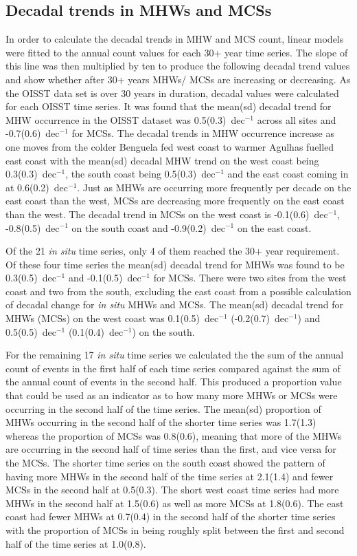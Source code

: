 \documentclass[a4paper,10pt,review]{elsarticle}
\begin{document}
\subsection{Decadal trends in MHWs and MCSs}
In order to calculate the decadal trends in MHW and MCS count, linear models were fitted to the annual count values for each 30+ year time series. The slope of this line was then multiplied by ten to produce the following decadal trend values and show whether after 30+ years MHWs/ MCSs are increasing or decreasing. As the OISST data set is over 30 years in duration, decadal values were calculated for each OISST time series. It was found that the mean(sd) decadal trend for MHW occurrence in the OISST dataset was 0.5(0.3)~dec$^{-1}$ across all sites and -0.7(0.6)~dec$^{-1}$ for MCSs. The decadal trends in MHW occurrence increase as one moves from the colder Benguela fed west coast to warmer Agulhas fuelled east coast with the mean(sd) decadal MHW trend on the west coast being 0.3(0.3)~dec$^{-1}$, the south coast being 0.5(0.3)~dec$^{-1}$ and the east coast coming in at 0.6(0.2)~dec$^{-1}$. Just as MHWs are occurring more frequently per decade on the east coast than the west, MCSs are decreasing more frequently on the east coast than the west. The decadal trend in MCSs on the west coast is -0.1(0.6)~dec$^{-1}$, -0.8(0.5)~dec$^{-1}$ on the south coast and -0.9(0.2)~dec$^{-1}$ on the east coast.

Of the 21 \emph{in situ} time series, only 4 of them reached the 30+ year requirement. Of these four time series the mean(sd) decadal trend for MHWs was found to be 0.3(0.5)~dec$^{-1}$ and -0.1(0.5)~dec$^{-1}$ for MCSs. There were two sites from the west coast and two from the south, excluding the east coast from a possible calculation of decadal change for \emph{in situ} MHWs and MCSs. The mean(sd) decadal trend for MHWs (MCSs) on the west coast was 0.1(0.5)~dec$^{-1}$ (-0.2(0.7)~dec$^{-1}$) and 0.5(0.5)~dec$^{-1}$ (0.1(0.4)~dec$^{-1}$) on the south.

For the remaining 17 \emph{in situ} time series we calculated the the sum of the annual count of events in the first half of each time series compared against the sum of the annual count of events in the second half. This produced a proportion value that could be used as an indicator as to how many more MHWs or MCSs were occurring in the second half of the time series. The mean(sd) proportion of MHWs occurring in the second half of the shorter time series was 1.7(1.3) whereas the proportion of MCSs was 0.8(0.6), meaning that more of the MHWs are occurring in the second half of time series than the first, and vice versa for the MCSs. The shorter time series on the south coast showed the pattern of having more MHWs in the second half of the time series at 2.1(1.4) and fewer MCSs in the second half at 0.5(0.3). The short west coast time series had more MHWs in the second half at 1.5(0.6) as well as more MCSs at 1.8(0.6). The east coast had fewer MHWs at 0.7(0.4) in the second half of the shorter time series with the proportion of MCSs in being roughly split between the first and second half of the time series at 1.0(0.8).
\end{document}
